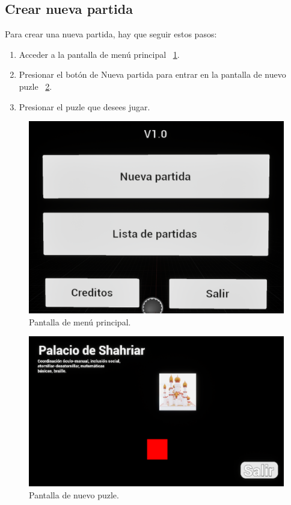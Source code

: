 \subsection{Crear nueva partida}
Para crear una nueva partida, hay que seguir estos pasos:
\begin{enumerate}
    \item Acceder a la pantalla de menú principal ~\ref{b:pantalla_menu_principal}.
    \item Presionar el botón de  Nueva partida para entrar en la pantalla de nuevo puzle ~\ref{b:pantalla_nuevo_puzle}.
    \item Presionar el puzle que desees jugar.
    
\end{enumerate}
\begin{figure}[h]
	\centering
	\includegraphics[width=\textwidth]{../img/anexos/pantalla_menu_principal.png}
    \caption[Pantalla de registro]{Pantalla de menú principal.}
	\label{b:pantalla_menu_principal}
\end{figure}

\begin{figure}[h]
	\centering
	\includegraphics[width=\textwidth]{../img/anexos/pantalla_nuevo_puzle.png}
    \caption[Pantalla de registro]{Pantalla de nuevo puzle.}
	\label{b:pantalla_nuevo_puzle}
\end{figure}

